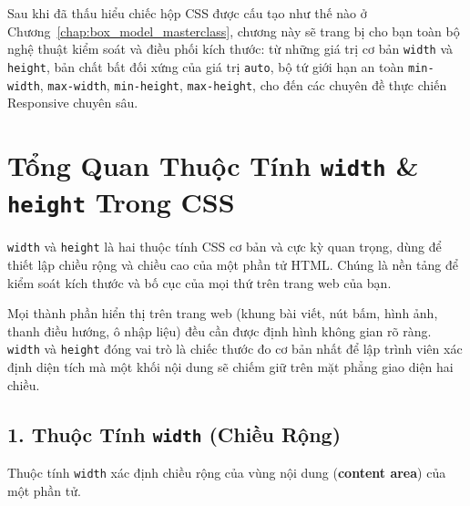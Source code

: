 \documentclass[11pt,oneside]{book}
\newcommand{\codeinline}[1]{\textcolor{accentOrange}{\texttt{#1}}}
\newcommand{\term}[1]{\textbf{\textcolor{primaryBlue}{#1}}}
\DeclareRobustCommand{\csshint}[1]{\texorpdfstring{\textcolor{accentOrange}{\textbf{\texttt{#1}}}}{#1}}
\begin{document}
\begin{conceptBox}
Sau khi đã thấu hiểu chiếc hộp CSS được cấu tạo như thế nào ở Chương~\ref{chap:box_model_masterclass}, chương này sẽ trang bị cho bạn toàn bộ nghệ thuật kiểm soát và điều phối kích thước: từ những giá trị cơ bản \codeinline{width} và \codeinline{height}, bản chất bất đối xứng của giá trị \codeinline{auto}, bộ tứ giới hạn an toàn \codeinline{min-width}, \codeinline{max-width}, \codeinline{min-height}, \codeinline{max-height}, cho đến các chuyên đề thực chiến Responsive chuyên sâu.
\end{conceptBox}

\section{Tổng Quan Thuộc Tính \csshint{width} \& \csshint{height} Trong CSS}
\label{sec:overview_width_height}

\codeinline{width} và \codeinline{height} là hai thuộc tính CSS cơ bản và cực kỳ quan trọng, dùng để thiết lập chiều rộng và chiều cao của một phần tử HTML. Chúng là nền tảng để kiểm soát kích thước và bố cục của mọi thứ trên trang web của bạn.

\begin{conceptBox}
Mọi thành phần hiển thị trên trang web (khung bài viết, nút bấm, hình ảnh, thanh điều hướng, ô nhập liệu) đều cần được định hình không gian rõ ràng. \codeinline{width} và \codeinline{height} đóng vai trò là chiếc thước đo cơ bản nhất để lập trình viên xác định diện tích mà một khối nội dung sẽ chiếm giữ trên mặt phẳng giao diện hai chiều.
\end{conceptBox}

\subsection{1. Thuộc Tính \csshint{width} (Chiều Rộng)}
\label{subsec:property_width}

Thuộc tính \codeinline{width} xác định chiều rộng của vùng nội dung (\term{content area}) của một phần tử.
\end{document}
